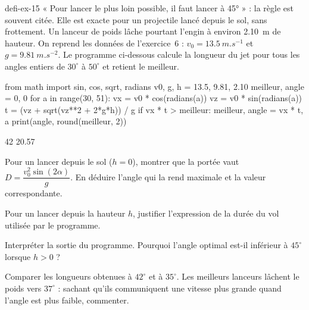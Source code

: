 \begin{blocEdition}{defi-ex-15}
« Pour lancer le plus loin possible, il faut lancer à 45° » : la règle est souvent citée. Elle est exacte pour un
projectile lancé depuis le sol, sans frottement. Un lanceur de poids lâche pourtant l'engin à environ \qty{2,10}{m} de
hauteur. On reprend les données de l'exercice~6 : $v_0=\qty{13,5}{m.s^{-1}}$ et $g=\qty{9,81}{m.s^{-2}}$. Le programme
ci-dessous calcule la longueur du jet pour tous les angles entiers de $30^\circ$ à $50^\circ$ et retient le meilleur.
\begin{codecote}[0.66]
\begin{pythoncol}
from math import sin, cos, sqrt, radians
v0, g, h = 13.5, 9.81, 2.10
meilleur, angle = 0, 0
for a in range(30, 51):
    vx = v0 * cos(radians(a))
    vz = v0 * sin(radians(a))
    t = (vz + sqrt(vz**2 + 2*g*h)) / g
    if vx * t > meilleur:
        meilleur, angle = vx * t, a
print(angle, round(meilleur, 2))
\end{pythoncol}
\cote
\begin{consolecol}
42 20.57
\end{consolecol}
\end{codecote}
\begin{questions}
\item Pour un lancer depuis le sol ($h=0$), montrer que la portée vaut $D=\dfrac{v_0^2\sin(2\alpha)}{g}$. En déduire l'angle qui
la rend maximale et la valeur correspondante.
\item Pour un lancer depuis la hauteur $h$, justifier l'expression de la durée du vol utilisée par le programme.
\item Interpréter la sortie du programme. Pourquoi l'angle optimal est-il inférieur à $45^\circ$ lorsque $h>0$ ?
\item Comparer les longueurs obtenues à $42^\circ$ et à $35^\circ$. Les meilleurs lanceurs lâchent le poids vers $37^\circ$ :
sachant qu'ils communiquent une vitesse plus grande quand l'angle est plus faible, commenter.
\end{questions}
\end{blocEdition}

